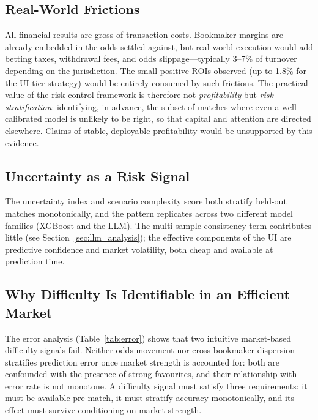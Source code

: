 \subsection{Real-World Frictions}
All financial results are gross of transaction costs. Bookmaker
margins are already embedded in the odds settled against, but
real-world execution would add betting taxes, withdrawal fees, and
odds slippage---typically 3--7\% of turnover depending on the
jurisdiction. The small positive ROIs observed (up to 1.8\% for the
UI-tier strategy) would be entirely consumed by such frictions. The
practical value of the risk-control framework is therefore not
\emph{profitability} but \emph{risk stratification}: identifying, in
advance, the subset of matches where even a well-calibrated model is
unlikely to be right, so that capital and attention are directed
elsewhere. Claims of stable, deployable profitability would be
unsupported by this evidence.

\subsection{Uncertainty as a Risk Signal}
The uncertainty index and scenario complexity score both stratify
held-out matches monotonically, and the pattern replicates across
two different model families (XGBoost and the LLM). The multi-sample
consistency term contributes little (see
Section~\ref{sec:llm_analysis}); the effective components of the UI
are predictive confidence and market volatility, both cheap and
available at prediction time.

\subsection{Why Difficulty Is Identifiable in an Efficient Market}


The error analysis (Table~\ref{tab:error}) shows that two intuitive
market-based difficulty signals fail. Neither odds movement nor
cross-bookmaker dispersion stratifies prediction error once market
strength is accounted for: both are confounded with the presence of
strong favourites, and their relationship with error rate is not
monotone. A difficulty signal must satisfy three requirements: it
must be available pre-match, it must stratify accuracy monotonically,
and its effect must survive conditioning on market strength.


